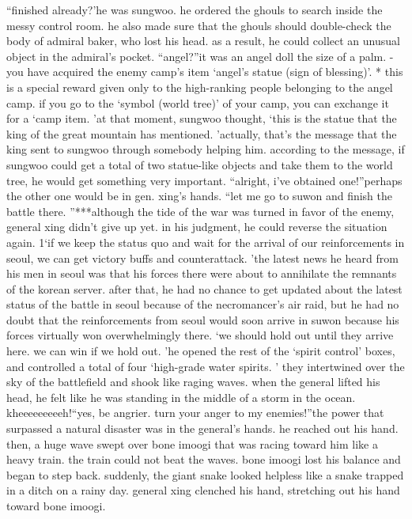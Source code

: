 “finished already?’he was sungwoo.
 he ordered the ghouls to search inside the messy control room.
 he also made sure that the ghouls should double-check the body of admiral baker, who lost his head.
as a result, he could collect an unusual object in the admiral’s pocket.
“angel?”it was an angel doll the size of a palm.
-you have acquired the enemy camp’s item ‘angel’s statue (sign of blessing)’.
* this is a special reward given only to the high-ranking people belonging to the angel camp.
 if you go to the ‘symbol (world tree)’ of your camp, you can exchange it for a ‘camp item.
’at that moment, sungwoo thought, ‘this is the statue that the king of the great mountain has mentioned.
’actually, that’s the message that the king sent to sungwoo through somebody helping him.
according to the message, if sungwoo could get a total of two statue-like objects and take them to the world tree, he would get something very important.
“alright, i’ve obtained one!”perhaps the other one would be in gen.
 xing’s hands.
“let me go to suwon and finish the battle there.
”***although the tide of the war was turned in favor of the enemy, general xing didn’t give up yet.
in his judgment, he could reverse the situation again.
1‘if we keep the status quo and wait for the arrival of our reinforcements in seoul, we can get victory buffs and counterattack.
’the latest news he heard from his men in seoul was that his forces there were about to annihilate the remnants of the korean server.
 after that, he had no chance to get updated about the latest status of the battle in seoul because of the necromancer’s air raid, but he had no doubt that the reinforcements from seoul would soon arrive in suwon because his forces virtually won overwhelmingly there.
‘we should hold out until they arrive here.
 we can win if we hold out.
’he opened the rest of the ‘spirit control’ boxes, and controlled a total of four ‘high-grade water spirits.
’ they intertwined over the sky of the battlefield and shook like raging waves.
 when the general lifted his head, he felt like he was standing in the middle of a storm in the ocean.
kheeeeeeeeeh!“yes, be angrier.
 turn your anger to my enemies!”the power that surpassed a natural disaster was in the general’s hands.
 he reached out his hand.
 then, a huge wave swept over bone imoogi that was racing toward him like a heavy train.
the train could not beat the waves.
 bone imoogi lost his balance and began to step back.
 suddenly, the giant snake looked helpless like a snake trapped in a ditch on a rainy day.
general xing clenched his hand, stretching out his hand toward bone imoogi.
